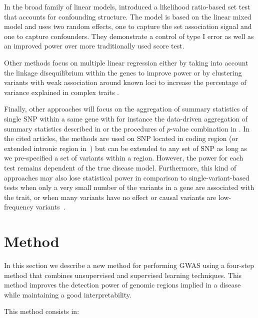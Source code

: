 \documentclass[]{book}
\begin{document}
In the broad family of linear models, \citep{listgarten_powerful_2013}
introduced a likelihood ratio-based set test that accounts for
confounding structure. The model is based on the linear mixed model and
uses two random effects, one to capture the set association signal and
one to capture confounders. They demonstrate a control of type I error
as well as an improved power over more traditionally used score test.

Other methods focus on multiple linear regression either by taking into
account the linkage disequilibrium within the genes to improve power
\citep{yoo_multiple_2016} or by clustering variants with weak association
around known loci to increase the percentage of variance explained in
complex traits \citep{pare_contribution_2015}.

Finally, other approaches will focus on the aggregation of summary
statistics of single SNP within a same gene with for instance the
data-driven aggregation of summary statistics described in
\citep{kwak_adaptive_2016} or the procedures of \(p\)-value combination in
\citep{petersen_assessing_2013}. In the cited articles, the methods are used
on SNP located in coding region (or extended intronic region
in~\citep{petersen_assessing_2013}) but can be extended to any set of SNP as
long as we pre-specified a set of variants within a region. However, the
power for each test remains dependent of the true disease model.
Furthermore, this kind of approaches may also lose statistical power in
comparison to single-variant-based tests when only a very small number
of the variants in a gene are associated with the trait, or when many
variants have no effect or causal variants are low-frequency
variants~\citep{lee_rare-variant_2014}.

\hypertarget{leosmethod}{%
\section{Method}\label{leosmethod}}

In this section we describe a new method for performing GWAS using a
four-step method that combines unsupervised and supervised learning
techniques. This method improves the detection power of genomic regions
implied in a disease while maintaining a good interpretability.

This method consists in:
\end{document}
